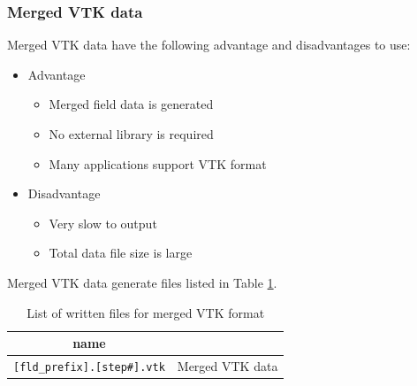 \subsubsection{Merged VTK data}
Merged VTK data have the following advantage and disadvantages to use:
%
\begin{itemize}
\item Advantage
\begin{itemize} 
\item Merged field data is generated
\item No external library is required
\item Many applications support VTK format
\end{itemize}
\item Disadvantage
\begin{itemize} 
\item Very slow to output
\item Total data file size is large
\end{itemize}
\end{itemize}
%
Merged VTK data generate files listed in Table \ref{table:Merged_vtk}. 
%
\begin{table}[htp]
\caption{List of written files for merged VTK format}
\begin{center} 
\begin{tabular}{|c|c|}
\hline
 name &  \\ \hline \hline
\verb|[fld_prefix].[step#].vtk|  & Merged VTK data  \\ \hline
\end{tabular}
\end{center}
\label{table:Merged_vtk}
\end{table}
%

